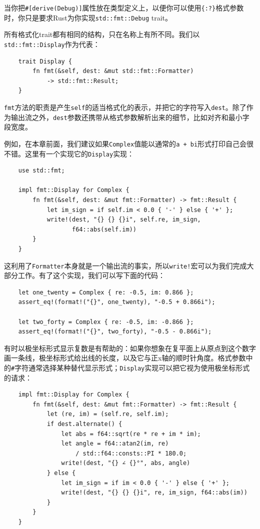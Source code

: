 当你把\texttt{\#[derive(Debug)]}属性放在类型定义上，以便你可以使用\texttt{\{:?\}}格式参数时，你只是要求Rust为你实现\texttt{std::fmt::Debug} trait。

所有格式化trait都有相同的结构，只在名称上有所不同。我们以\texttt{std::fmt::Display}作为代表：
\begin{verbatim}
    trait Display {
        fn fmt(&self, dest: &mut std::fmt::Formatter)
            -> std::fmt::Result;
    }
\end{verbatim}

\texttt{fmt}方法的职责是产生\texttt{self}的适当格式化的表示，并把它的字符写入\texttt{dest}。除了作为输出流之外，\texttt{dest}参数还携带从格式参数解析出来的细节，比如对齐和最小字段宽度。

例如，在本章前面，我们建议如果\texttt{Complex}值能以通常的\texttt{a + bi}形式打印自己会很不错。这里有一个实现它的\texttt{Display}实现：
\begin{verbatim}
    use std::fmt;

    impl fmt::Display for Complex {
        fn fmt(&self, dest: &mut fmt::Formatter) -> fmt::Result {
            let im_sign = if self.im < 0.0 { '-' } else { '+' };
            write!(dest, "{} {} {}i", self.re, im_sign,
                   f64::abs(self.im))
        }
    }
\end{verbatim}

这利用了\texttt{Formatter}本身就是一个输出流的事实，所以\texttt{write!}宏可以为我们完成大部分工作。有了这个实现，我们可以写下面的代码：
\begin{verbatim}
    let one_twenty = Complex { re: -0.5, im: 0.866 };
    assert_eq!(format!("{}", one_twenty), "-0.5 + 0.866i");

    let two_forty = Complex { re: -0.5, im: -0.866 };
    assert_eq!(format!("{}", two_forty), "-0.5 - 0.866i");
\end{verbatim}

有时以极坐标形式显示复数是有帮助的：如果你想象在复平面上从原点到这个数字画一条线，极坐标形式给出线的长度，以及它与正x轴的顺时针角度。格式参数中的\texttt{\#}字符通常选择某种替代显示形式；\texttt{Display}实现可以把它视为使用极坐标形式的请求：
\begin{verbatim}
    impl fmt::Display for Complex {
        fn fmt(&self, dest: &mut fmt::Formatter) -> fmt::Result {
            let (re, im) = (self.re, self.im);
            if dest.alternate() {
                let abs = f64::sqrt(re * re + im * im);
                let angle = f64::atan2(im, re)
                    / std::f64::consts::PI * 180.0;
                write!(dest, "{} ∠ {}°", abs, angle)
            } else {
                let im_sign = if im < 0.0 { '-' } else { '+' };
                write!(dest, "{} {} {}i", re, im_sign, f64::abs(im))
            }
        }
    }
\end{verbatim}

